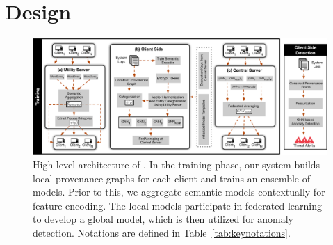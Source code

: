 \section{Design}
\label{sec:methodology}


\begin{figure}[t!]
  \centering
  \includegraphics[width=1\textwidth]{fig/archv3.pdf}
  \caption{High-level architecture of \Sys. In the training phase, our system builds local provenance graphs for each client and trains an ensemble of \gnnshort models. Prior to this, we aggregate semantic models contextually for feature encoding. The local \gnnshort models participate in federated learning to develop a global \gnnshort model, which is then utilized for anomaly detection. Notations are defined in Table~\ref{tab:keynotations}. }
  \vspace{-3ex}
  \label{fig:arch}
\end{figure}


